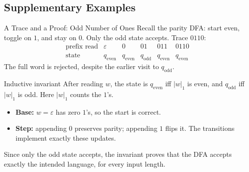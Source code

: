 \documentclass[10pt]{beamer}
\begin{document}
\subsection{Supplementary Examples}

\begin{frame}{A Trace and a Proof: Odd Number of Ones}
  \small
  Recall the parity DFA: start even, toggle on $1$, and stay on $0$.
  Only the odd state accepts. Trace $0110$:
  \[
    \begin{array}{c|ccccc}
      \text{prefix read} & \varepsilon & 0 & 01 & 011 & 0110\\
      \hline
      \text{state} & q_{\mathrm{even}} & q_{\mathrm{even}} & q_{\mathrm{odd}}
        & q_{\mathrm{even}} & q_{\mathrm{even}}
    \end{array}
  \]
  The full word is rejected, despite the earlier visit to $q_{\mathrm{odd}}$.
  \pause
  \begin{block}{Inductive invariant}
    After reading $w$, the state is $q_{\mathrm{even}}$ iff $|w|_1$ is even,
    and $q_{\mathrm{odd}}$ iff $|w|_1$ is odd. Here $|w|_1$ counts the $1$'s.
    \begin{itemize}
      \item \textbf{Base:} $w=\varepsilon$ has zero $1$'s, so the start is correct.
      \item \textbf{Step:} appending $0$ preserves parity; appending $1$ flips it.
        The transitions implement exactly these updates.
    \end{itemize}
  \end{block}
  \pause
  Since only the odd state accepts, the invariant proves that the DFA accepts
  exactly the intended language, for every input length.
\end{frame}
\end{document}
